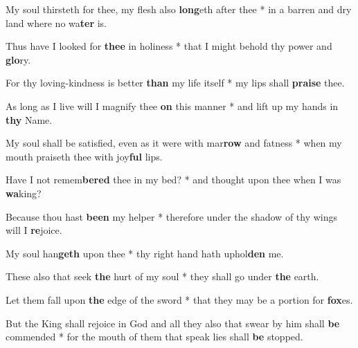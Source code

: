 \begin{multicols}{2}
	My soul thirsteth for thee, my flesh also \textbf{long}eth after thee * in a barren and dry land where no wa\textbf{ter} is.
	
	Thus have I looked for \textbf{thee} in holiness * that I might behold thy power and \textbf{glo}ry.
	
	For thy loving-kindness is better \textbf{than} my life itself * my lips shall \textbf{praise} thee.
	
	As long as I live will I magnify thee \textbf{on} this manner * and lift up my hands in \textbf{thy} Name.
	
	My soul shall be satisfied, even as it were with mar\textbf{row} and fatness * when my mouth praiseth thee with joy\textbf{ful} lips.
	
	Have I not remem\textbf{bered} thee in my bed? * and thought upon thee when I was \textbf{wa}king?
	
	Because thou hast \textbf{been} my helper * therefore under the shadow of thy wings will I \textbf{re}joice.
	
	My soul han\textbf{geth} upon thee * thy right hand hath uphol\textbf{den} me.
	
	These also that seek \textbf{the} hurt of my soul * they shall go under \textbf{the} earth.
	
	Let them fall upon \textbf{the} edge of the sword * that they may be a portion for \textbf{fox}es.
	
	But the King shall rejoice in God and all they also that swear by him shall \textbf{be} commended * for the mouth of them that speak lies shall \textbf{be} stopped.
\end{multicols}